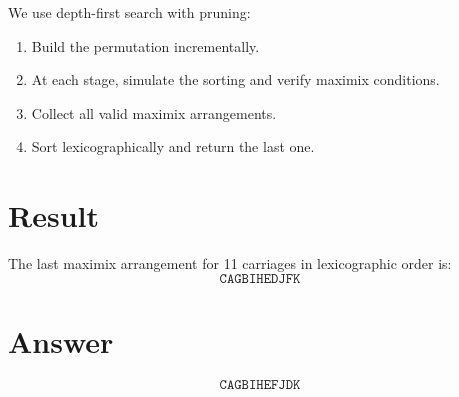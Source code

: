 \documentclass[12pt]{article}
\begin{document}
We use depth-first search with pruning:
\begin{enumerate}
    \item Build the permutation incrementally.
    \item At each stage, simulate the sorting and verify maximix conditions.
    \item Collect all valid maximix arrangements.
    \item Sort lexicographically and return the last one.
\end{enumerate}

\section{Result}

The last maximix arrangement for 11 carriages in lexicographic order is:
\[
    \boxed{\texttt{CAGBIHEDJFK}}
\]

\section{Answer}

\[
\boxed{\texttt{CAGBIHEFJDK}}
\]
\end{document}
